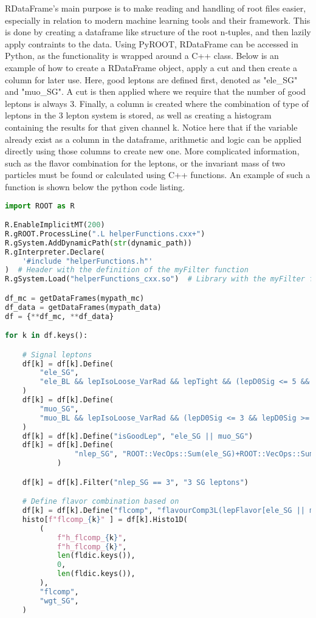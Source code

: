 RDataFrame's main purpose is to make reading and handling of root files easier, especially in relation to modern machine learning tools and their framework. 
This is done by creating a dataframe like structure of the root n-tuples, and then lazily 
apply contraints to the data. Using PyROOT, RDataFrame can be accessed in Python, as the functionality is wrapped around a C++ class. Below is an example of how
to create a RDataFrame object, apply a cut and then create a column for later use. Here, good leptons are defined first, denoted as "ele\_SG" and "muo\_SG". 
A cut is then applied where we require that the number of good leptons is always 3. Finally, a column is created where the combination of type of leptons in the 3 lepton system 
is stored, as well as creating a histogram containing the results for that given channel k. Notice here that if the variable already exist as a column in the dataframe, arithmetic and logic can be 
applied directly using those columns to create new one. More complicated information, such as the flavor combination for the leptons, or the invariant mass of two particles must be 
found or calculated using C++ functions. An example of such a function is shown below the python code listing. 


\begin{lstlisting}[language=Python, style=pythonstyle, label={code:python_func_example}]
import ROOT as R

R.EnableImplicitMT(200)
R.gROOT.ProcessLine(".L helperFunctions.cxx+")
R.gSystem.AddDynamicPath(str(dynamic_path))
R.gInterpreter.Declare(
    '#include "helperFunctions.h"'
)  # Header with the definition of the myFilter function
R.gSystem.Load("helperFunctions_cxx.so")  # Library with the myFilter function

df_mc = getDataFrames(mypath_mc)
df_data = getDataFrames(mypath_data)
df = {**df_mc, **df_data}

for k in df.keys():

    # Signal leptons
    df[k] = df[k].Define(
        "ele_SG",
        "ele_BL && lepIsoLoose_VarRad && lepTight && (lepD0Sig <= 5 && lepD0Sig >= -5)",
    )  
    df[k] = df[k].Define(
        "muo_SG",
        "muo_BL && lepIsoLoose_VarRad && (lepD0Sig <= 3 && lepD0Sig >= -3)",
    )  
    df[k] = df[k].Define("isGoodLep", "ele_SG || muo_SG")
    df[k] = df[k].Define(
                "nlep_SG", "ROOT::VecOps::Sum(ele_SG)+ROOT::VecOps::Sum(muo_SG)"
            )

    df[k] = df[k].Filter("nlep_SG == 3", "3 SG leptons")

    # Define flavor combination based on 
    df[k] = df[k].Define("flcomp", "flavourComp3L(lepFlavor[ele_SG || muo_SG])")
    histo[f"flcomp_{k}" ] = df[k].Histo1D(
        (
            f"h_flcomp_{k}",
            f"h_flcomp_{k}",
            len(fldic.keys()),
            0,
            len(fldic.keys()),
        ),
        "flcomp",
        "wgt_SG",
    )
    \end{lstlisting}




